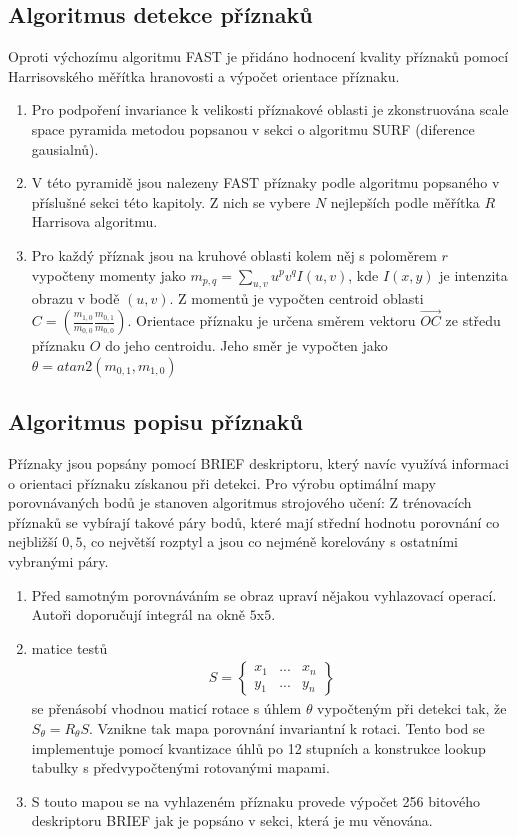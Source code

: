 \subsection{Algoritmus detekce příznaků}

Oproti výchozímu algoritmu FAST je přidáno hodnocení kvality příznaků pomocí Harrisovského měřítka hranovosti a výpočet orientace příznaku.

\begin{enumerate}
	\item Pro podpoření invariance k velikosti příznakové oblasti je zkonstruována scale space pyramida metodou popsanou v sekci o algoritmu SURF (diference gausialnů).
	\item V této pyramidě jsou nalezeny FAST příznaky podle algoritmu popsaného v příslušné sekci této kapitoly. Z nich se vybere $N$ nejlepších podle měřítka $R$ Harrisova algoritmu.
	\item Pro každý příznak jsou na kruhové oblasti kolem něj s poloměrem $r$ vypočteny momenty jako $m_{p,q} = \sum_{u,v} u^p v^q I(u,v)$, kde $I(x,y)$ je intenzita obrazu v bodě $(u,v)$. Z momentů je vypočten centroid oblasti $C = (\frac{m_{1,0}}{m_{0,0}} \frac{m_{0,1}}{m_{0,0}})$. Orientace příznaku je určena směrem vektoru $\vec{OC}$ ze středu příznaku $O$ do jeho centroidu. Jeho směr je vypočten jako $\theta = atan2(m_{0,1}, m_{1,0})$
\end{enumerate}

\subsection{Algoritmus popisu příznaků}

Příznaky jsou popsány pomocí BRIEF deskriptoru, který navíc využívá informaci o orientaci příznaku získanou při detekci. Pro výrobu optimální mapy porovnávaných bodů je stanoven algoritmus strojového učení: Z trénovacích příznaků se vybírají takové páry bodů, které mají střední hodnotu porovnání co nejbližší $0,5$, co největší rozptyl a jsou co nejméně korelovány s ostatními vybranými páry.

\begin{enumerate}
	\item Před samotným porovnáváním se obraz upraví nějakou vyhlazovací operací. Autoři doporučují integrál na okně $5$x$5$. 
	\item matice testů
	\begin{align}
	S =
	\begin{Bmatrix}
	x_1 & ... & x_n \\
	y_1 & ... & y_n
	\end{Bmatrix}
	\end{align}
	se přenásobí vhodnou maticí rotace s úhlem $\theta$ vypočteným při detekci tak, že $S_{\theta} = R_{\theta}S$. Vznikne tak mapa porovnání invariantní k rotaci. Tento bod se implementuje pomocí kvantizace úhlů po 12 stupních a konstrukce lookup tabulky s předvypočtenými rotovanými mapami.
	\item S touto mapou se na vyhlazeném příznaku provede výpočet 256 bitového deskriptoru BRIEF jak je popsáno v sekci, která je mu věnována.
\end{enumerate}

